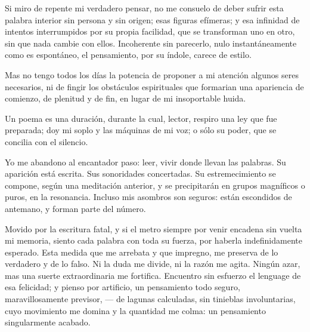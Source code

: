 



\bigskip

Si miro de repente mi verdadero pensar, no me consuelo de deber sufrir
esta palabra interior sin persona y sin origen; esas figuras
efímeras; y esa infinidad de intentos interrumpidos por su
propia facilidad, que se transforman uno en otro, sin que nada cambie
con ellos. Incoherente sin parecerlo, nulo instantáneamente como es
espontáneo, el pensamiento, por su índole, carece de estilo.

Mas no tengo todos los días la potencia de proponer a mi
atención algunos seres necesarios, ni de fingir los obstáculos
espirituales que formarian una apariencia de comienzo, de plenitud y
de fin, en lugar de mi insoportable huida.

Un poema es una duración, durante la cual, lector, respiro una ley
que fue preparada; doy mi soplo y las máquinas de mi voz; o sólo
su poder, que se concilia con el silencio.

Yo me abandono al encantador paso: leer, vivir donde llevan las
palabras. Su aparición está escrita. Sus sonoridades
concertadas. Su estremecimiento se compone, según una meditación
anterior, y se precipitarán en grupos  magníficos o puros, en
la resonancia. Incluso mis asombros son seguros: están escondidos de
antemano, y forman parte del número.

Movido por la escritura fatal, y si el metro siempre por venir
encadena sin vuelta mi memoria, siento cada palabra con toda su
fuerza, por haberla indefinidamente esperado. Esta medida que me
arrebata y que impregno, me preserva de lo verdadero y de lo falso. Ni
la duda me divide, ni la razón me agita. Ningún azar, mas una
suerte extraordinaria me fortifica. Encuentro sin esfuerzo el lenguage
de esa felicidad; y pienso por artificio, un pensamiento todo seguro,
maravillosamente previsor, --- de lagunas calculadas, sin tinieblas
involuntarias, cuyo movimiento me domina y la quantidad me colma: un
pensamiento singularmente acabado.

\newpage



\bigskip

